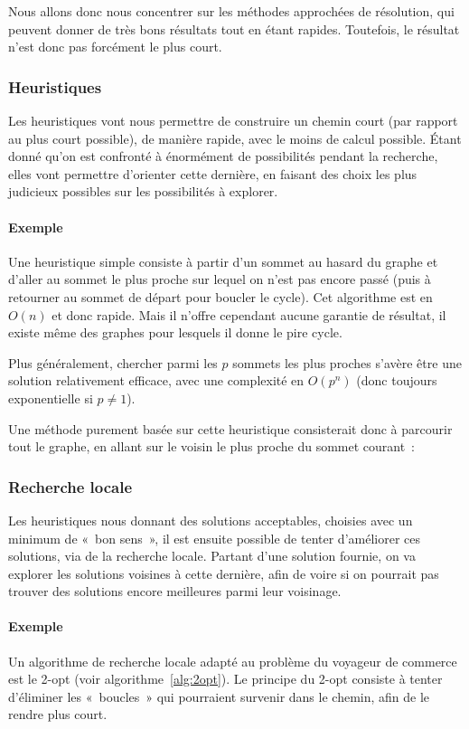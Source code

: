     Nous allons donc nous concentrer sur les méthodes approchées de résolution,
    qui peuvent donner de très bons résultats tout en étant rapides.
    Toutefois, le résultat n'est donc pas forcément le plus court.

  \subsubsection{Heuristiques}
    Les heuristiques vont nous permettre de construire un chemin court (par
    rapport au plus court possible), de manière rapide, avec le moins de calcul
    possible.  Étant donné qu'on est confronté à énormément de possibilités
    pendant la recherche, elles vont permettre d'orienter cette dernière, en
    faisant des choix les plus judicieux possibles sur les possibilités à
    explorer.

    \paragraph{Exemple} Une heuristique simple consiste à partir d'un sommet au
    hasard du graphe et d'aller au sommet le plus proche sur lequel on n'est
    pas encore passé (puis à retourner au sommet de départ pour boucler le
    cycle). Cet algorithme est en $O(n)$ et donc rapide. Mais il n'offre
    cependant aucune garantie de résultat, il existe même des graphes pour
    lesquels il donne le pire cycle.

    Plus généralement, chercher parmi les $p$ sommets les plus proches s'avère
    être une solution relativement efficace, avec une complexité en $O(p^n)$
    (donc toujours exponentielle si $p \neq 1$).

    Une méthode purement basée sur cette heuristique consisterait donc à parcourir
    tout le graphe, en allant sur le voisin le plus proche du sommet courant~:


  \subsubsection{Recherche locale}
    Les heuristiques nous donnant des solutions acceptables, choisies avec un
    minimum de «~bon sens~», il est ensuite possible de tenter d'améliorer
    ces solutions, via de la recherche locale.
    Partant d'une solution fournie, on va explorer les solutions voisines
    à cette dernière, afin de voire si on pourrait pas trouver des solutions
    encore meilleures parmi leur voisinage.

    \paragraph{Exemple} Un algorithme de recherche locale adapté au problème
    du voyageur de commerce est le 2-opt (voir algorithme~\ref{alg:2opt}).
    Le principe du 2-opt consiste à tenter d'éliminer les «~boucles~» qui
    pourraient survenir dans le chemin, afin de le rendre plus court.
    \cite{two_opt}

